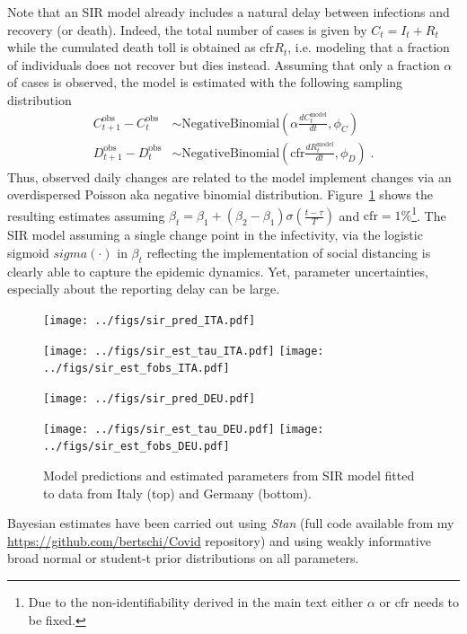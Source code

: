 \documentclass[fullpage,a4paper]{article}
\newcommand{\fig}[1]{Figure~\ref{fig:#1}}
\begin{document}
Note that an SIR model already includes a natural delay between
infections and recovery (or death). Indeed, the total number of cases
is given by $C_t = I_t + R_t$ while the cumulated death toll is
obtained as $\mathrm{cfr} R_t$, i.e. modeling that a fraction of
individuals does not recover but dies instead. Assuming that only a
fraction $\alpha$ of cases is observed, the model is estimated with
the following sampling distribution
\begin{align*}
  C^{\mathrm{obs}}_{t+1} - C^{\mathrm{obs}}_t &\sim \mathrm{NegativeBinomial}\left(\alpha \frac{dC^{\mathrm{model}}_t}{dt}, \phi_C \right) \\
  D^{\mathrm{obs}}_{t+1} - D^{\mathrm{obs}}_t &\sim \mathrm{NegativeBinomial}\left(\mathrm{cfr} \frac{dR^{\mathrm{model}}_t}{dt}, \phi_D \right) \; .
\end{align*}
Thus, observed daily changes are related to the model implement
changes via an overdispersed Poisson aka negative binomial
distribution. \fig{sir_fit} shows the resulting estimates assuming
$\beta_t = \beta_1 + (\beta_2 - \beta_1) \sigma(\frac{t - \tau}{T})$
and $\mathrm{cfr} = 1\%$\footnote{Due to the non-identifiability
  derived in the main text either $\alpha$ or $\mathrm{cfr}$ needs to
  be fixed.}.  The SIR model assuming a single change point in the
infectivity, via the logistic sigmoid $sigma(\cdot)$ in $\beta_t$
reflecting the implementation of social distancing is clearly able to
capture the epidemic dynamics. Yet, parameter uncertainties,
especially about the reporting delay can be large.
\begin{figure}
  \begin{minipage}{0.66\textwidth}
    \texttt{[image: ../figs/sir\_pred\_ITA.pdf]}      
  \end{minipage}
  \begin{minipage}{0.33\textwidth}
    \texttt{[image: ../figs/sir\_est\_tau\_ITA.pdf]}
    \texttt{[image: ../figs/sir\_est\_fobs\_ITA.pdf]}
  \end{minipage}
  \begin{minipage}{0.66\textwidth}
    \texttt{[image: ../figs/sir\_pred\_DEU.pdf]}      
  \end{minipage}
  \begin{minipage}{0.33\textwidth}
    \texttt{[image: ../figs/sir\_est\_tau\_DEU.pdf]}
    \texttt{[image: ../figs/sir\_est\_fobs\_DEU.pdf]}
  \end{minipage}
  \caption{\label{fig:sir_fit} Model predictions and estimated
    parameters from SIR model fitted to data from Italy (top) and
    Germany (bottom).}
\end{figure}

Bayesian estimates have been carried out using {\em Stan} (full code
available from my
\href{Github}{\url{https://github.com/bertschi/Covid}} repository) and
using weakly informative broad normal or student-t prior distributions
on all parameters.
\end{document}
